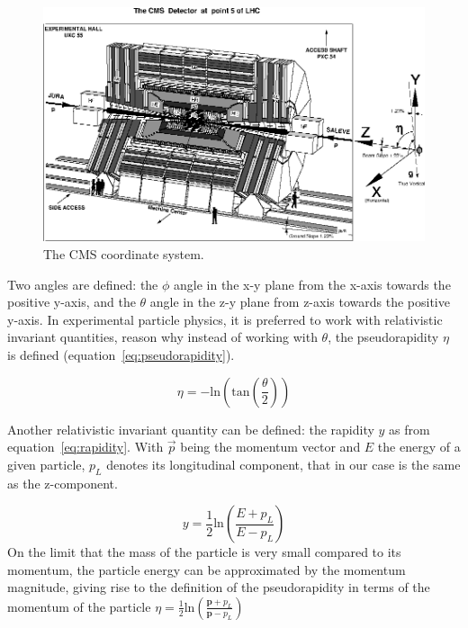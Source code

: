 \begin{figure}[!Hhtbp]
  \begin{center}
    \includegraphics[width=\textwidth]{figs/CMS_coordinates.jpg}
    \caption{The CMS coordinate system. }
    \label{fig:cmscoor}
  \end{center}
\end{figure}

Two angles are defined: the $\phi$ angle in the x-y plane from the x-axis towards the positive y-axis, and the $\theta$ angle in the z-y plane from z-axis towards the positive y-axis. In experimental particle physics, it is preferred to work with relativistic invariant quantities, reason why instead of working with $\theta$, the pseudorapidity $\eta$ is defined (equation~\ref{eq:pseudorapidity}). 

\begin{equation}
  \label{eq:pseudorapidity}
  \eta = -\text{ln}\left( \text{tan}\left(\frac{\theta}{2}\right)\right)
\end{equation} 

Another relativistic invariant quantity can be defined: the rapidity $y$ as from equation~\ref{eq:rapidity}. With $\vec{p}$ being the momentum vector and $E$ the energy of a given particle, $p_{L}$ denotes its longitudinal component, that in our case is the same as the z-component. 

\begin{equation}
  \label{eq:rapidity}
  y=\frac{1}{2}\text{ln}\left(\frac{E+p_{L}}{E-p_{L}}\right)
\end{equation} On the limit that the mass of the particle is very small compared to its momentum, the particle energy can be approximated by the momentum magnitude, giving rise to the definition of the pseudorapidity in terms of the momentum of the particle $\eta = \frac{1}{2}\text{ln}\left(\frac{\bm{p}+p_{L}}{\bm{p}-p_{L}}\right)$

